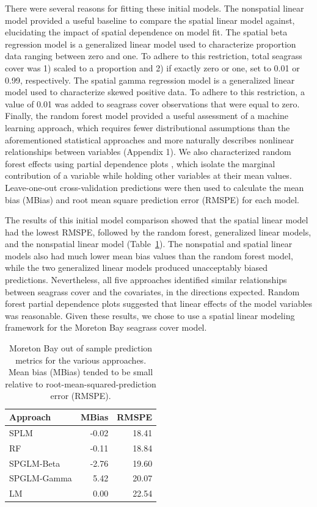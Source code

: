 \documentclass[
  letterpaper,
  DIV=11,
  numbers=noendperiod]{scrartcl}
\begin{document}
There were several reasons for fitting these initial models. The
nonspatial linear model provided a useful baseline to compare the
spatial linear model against, elucidating the impact of spatial
dependence on model fit. The spatial beta regression model is a
generalized linear model used to characterize proportion data ranging
between zero and one. To adhere to this restriction, total seagrass
cover was 1) scaled to a proportion and 2) if exactly zero or one, set
to 0.01 or 0.99, respectively. The spatial gamma regression model is a
generalized linear model used to characterize skewed positive data. To
adhere to this restriction, a value of 0.01 was added to seagrass cover
observations that were equal to zero. Finally, the random forest model
provided a useful assessment of a machine learning approach, which
requires fewer distributional assumptions than the aforementioned
statistical approaches and more naturally describes nonlinear
relationships between variables (Appendix 1). We also characterized
random forest effects using partial dependence plots
\citep{greenwell2017pdp}, which isolate the marginal contribution of a
variable while holding other variables at their mean values.
Leave-one-out cross-validation predictions were then used to calculate
the mean bias (MBias) and root mean square prediction error (RMSPE) for
each model.

The results of this initial model comparison showed that the spatial
linear model had the lowest RMSPE, followed by the random forest,
generalized linear models, and the nonspatial linear model
(Table~\ref{tbl-mb_cv}). The nonspatial and spatial linear models also
had much lower mean bias values than the random forest model, while the
two generalized linear models produced unacceptably biased predictions.
Nevertheless, all five approaches identified similar relationships
between seagrass cover and the covariates, in the directions expected.
Random forest partial dependence plots \citep{greenwell2017pdp}
suggested that linear effects of the model variables was reasonable.
Given these results, we chose to use a spatial linear modeling framework
for the Moreton Bay seagrass cover model.

\begin{longtable}[]{@{}lrr@{}}

\caption{\label{tbl-mb_cv}Moreton Bay out of sample prediction metrics
for the various approaches. Mean bias (MBias) tended to be small
relative to root-mean-squared-prediction error (RMSPE).}

\tabularnewline

\toprule\noalign{}
Approach & MBias & RMSPE \\
\midrule\noalign{}
\endhead
\bottomrule\noalign{}
\endlastfoot
SPLM & -0.02 & 18.41 \\
RF & -0.11 & 18.84 \\
SPGLM-Beta & -2.76 & 19.60 \\
SPGLM-Gamma & 5.42 & 20.07 \\
LM & 0.00 & 22.54 \\

\end{longtable}
\end{document}
